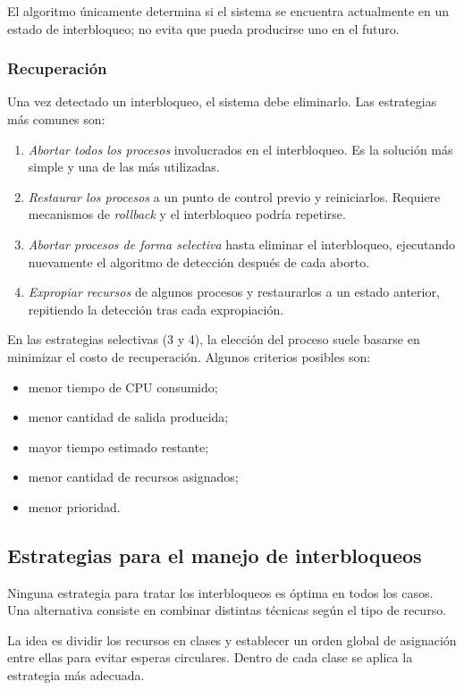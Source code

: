 El algoritmo únicamente determina si el sistema se encuentra actualmente en un estado de interbloqueo; no evita que pueda producirse uno en el futuro.

\subsubsection{Recuperación}

Una vez detectado un interbloqueo, el sistema debe eliminarlo. Las estrategias más comunes son:
\begin{enumerate}
  \item \textit{Abortar todos los procesos} involucrados en el interbloqueo. Es la solución más simple y una de las más utilizadas.
  \item \textit{Restaurar los procesos} a un punto de control previo y reiniciarlos. Requiere mecanismos de \textit{rollback} y el interbloqueo podría repetirse.
  \item \textit{Abortar procesos de forma selectiva} hasta eliminar el interbloqueo, ejecutando nuevamente el algoritmo de detección después de cada aborto.
  \item \textit{Expropiar recursos} de algunos procesos y restaurarlos a un estado anterior, repitiendo la detección tras cada expropiación.
\end{enumerate}

En las estrategias selectivas (3 y 4), la elección del proceso suele basarse en minimizar el costo de recuperación. Algunos criterios posibles son:
\begin{itemize}
  \item menor tiempo de CPU consumido;
  \item menor cantidad de salida producida;
  \item mayor tiempo estimado restante;
  \item menor cantidad de recursos asignados;
  \item menor prioridad.
\end{itemize}

\subsection{Estrategias para el manejo de interbloqueos}

Ninguna estrategia para tratar los interbloqueos es óptima en todos los casos. Una alternativa consiste en combinar distintas técnicas según el tipo de recurso.

La idea es dividir los recursos en clases y establecer un orden global de asignación entre ellas para evitar esperas circulares. Dentro de cada clase se aplica la estrategia más adecuada.

